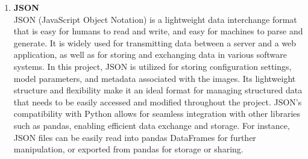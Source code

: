 \begin{enumerate}
	
	\item \textbf{JSON} \\
	JSON (JavaScript Object Notation) is a lightweight data interchange format that is easy for humans to read and write, and easy for machines to parse and generate. It is widely used for transmitting data between a server and a web application, as well as for storing and exchanging data in various software systems.
	In this project, JSON is utilized for storing configuration settings, model parameters, and metadata associated with the images. Its lightweight structure and flexibility make it an ideal format for managing structured data that needs to be easily accessed and modified throughout the project.
	JSON's compatibility with Python allows for seamless integration with other libraries such as pandas, enabling efficient data exchange and storage. For instance, JSON files can be easily read into pandas DataFrames for further manipulation, or exported from pandas for storage or sharing.
	
\end{enumerate}




